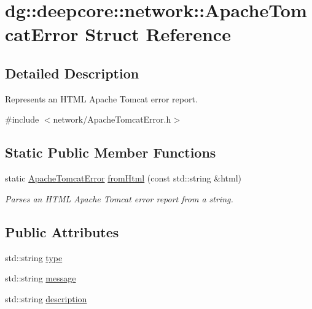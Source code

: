 \hypertarget{structdg_1_1deepcore_1_1network_1_1_apache_tomcat_error}{}\section{dg\+:\+:deepcore\+:\+:network\+:\+:Apache\+Tomcat\+Error Struct Reference}
\label{structdg_1_1deepcore_1_1network_1_1_apache_tomcat_error}


\subsection{Detailed Description}
Represents an H\+T\+ML Apache Tomcat error report. 

{\ttfamily \#include $<$network/\+Apache\+Tomcat\+Error.\+h$>$}

\subsection*{Static Public Member Functions}
\begin{DoxyCompactItemize}
\item 
static \hyperlink{structdg_1_1deepcore_1_1network_1_1_apache_tomcat_error}{Apache\+Tomcat\+Error} \hyperlink{group___network_module_ga84792c450664512e6891ecccbb205944}{from\+Html} (const std\+::string \&html)
\begin{DoxyCompactList}\small\item\em Parses an H\+T\+ML Apache Tomcat error report from a string. \end{DoxyCompactList}\end{DoxyCompactItemize}
\subsection*{Public Attributes}
\begin{DoxyCompactItemize}
\item 
std\+::string \hyperlink{structdg_1_1deepcore_1_1network_1_1_apache_tomcat_error_ab36a2b24595385f2b1f169317249dcf0}{type}
\item 
std\+::string \hyperlink{structdg_1_1deepcore_1_1network_1_1_apache_tomcat_error_a7a12e42bbfd8fa3548a148b67e5a8fb1}{message}
\item 
std\+::string \hyperlink{structdg_1_1deepcore_1_1network_1_1_apache_tomcat_error_a0ecd13bf1b2c5af20f99af250abb38f0}{description}
\end{DoxyCompactItemize}


